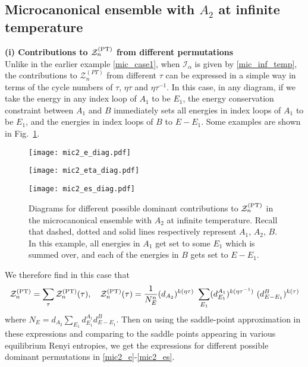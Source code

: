 \documentclass[a4paper,11pt]{article}
\newcommand{\be}{\begin{equation}}
\newcommand{\ee}{\end{equation}}
\newcommand\al{{\alpha}}
\newcommand\sI{{\ensuremath{{\mathcal I}}}}
\newcommand\sZ{{\mathcal Z}}
\begin{document}
\begin{enumerate}
\begin{appendix}
\subsection{Microcanonical ensemble with $A_2$ at infinite temperature}
\label{app:mic_a2}
\textbf{(i) Contributions to $\sZ_n^{\rm (PT)}$ from different permutations}\\
Unlike in the earlier example \eqref{mic_case1}, when $\sI_{\al}$ is given by \eqref{mic_inf_temp}, the contributions to $\sZ_n^{(PT)}$ from different $\tau$ can be expressed in a simple way in terms of the cycle numbers of $\tau$, $\eta \tau$ and $\eta \tau^{-1}$. In this case, in any diagram, if we take the energy in any index loop of $A_1$ to be $E_1$, the energy conservation constraint between $A_1$ and $B$ immediately sets all energies in index loops of $A_1$ to be $E_1$, and the energies in index loops of $B$ to $E-E_1$. Some examples are shown in Fig.~\ref{fig:mic2_infb_taus}. 
\begin{figure}[] 
\centering
\texttt{[image: mic2\_e\_diag.pdf]}

\vspace{0.2cm}

\texttt{[image: mic2\_eta\_diag.pdf]} 

\vspace{0.2cm}

\texttt{[image: mic2\_es\_diag.pdf]}
\caption{Diagrams for different possible dominant contributions to $\sZ_n^{\rm (PT)}$ in the microcanonical ensemble with $A_2$ at infinite temperature. Recall that dashed, dotted and solid lines respectively represent $A_1$, $A_2$, $B$. In this example, all energies in $A_1$ get set to some $E_1$ which is summed over, and each of the energies in $B$ gets set to $E-E_1$.}
\label{fig:mic2_infb_taus}
\end{figure}

We therefore find in this case that 
\be 
\sZ_n^{\rm (PT)} = \sum_{\tau} \sZ_n^{\rm (PT)}(\tau) , \quad \sZ_n^{\rm (PT)}(\tau) = \frac{1}{N_E^n}({d_{A_2}})^{k(\eta\tau)} ~ \sum_{E_1}(d^{A_1}_{E_{1}})^{k(\eta \tau^{-1})}~ (d^{B}_{E- E_1})^{k(\tau)} \label{zn_mic2}
\ee
where $N_E = d_{A_2} \sum_{E_1} d^{A_1}_{E_1}d^{B}_{E-E_1}$.
Then on using the saddle-point approximation in these expressions and comparing to the saddle points appearing in various equilibrium Renyi entropies, we get the expressions for different possible dominant permutations in \eqref{mic2_e}-\eqref{mic2_es}. \\ 


\end{appendix}
\end{enumerate}
\end{document}
